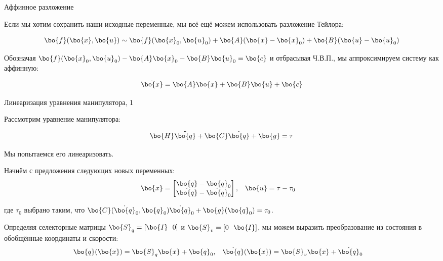 \documentclass{beamer}
\begin{document}
\begin{frame}{Аффинное разложение}
	\begin{flushleft}
		
		Если мы хотим сохранить наши исходные переменные, мы всё ещё можем использовать разложение Тейлора:
		
		\begin{equation}
			\bo{f}(\bo{x}, \bo{u}) 	\sim \bo{f}(\bo{x}_0, \bo{u}_0) +
			\bo{A} (\bo{x} - \bo{x}_0) + 
			\bo{B} (\bo{u} - \bo{u}_0)
		\end{equation}
		
		Обозначая $ \bo{f}(\bo{x}_0, \bo{u}_0) - \bo{A}\bo{x}_0 - \bo{B} \bo{u}_0 = \bo{c}$ и отбрасывая Ч.В.П., мы аппроксимируем систему как аффинную:
		
		\begin{equation}
			\dot{\bo{x}} = \bo{A} \bo{x} + 
			\bo{B} \bo{u} + \bo{c}
		\end{equation}
		
		
	\end{flushleft}
\end{frame}



\begin{frame}{Линеаризация уравнения манипулятора, 1}
	\begin{flushleft}
		
		Рассмотрим уравнение манипулятора:
		
		\begin{equation}
			\bo{H} \ddot{\bo{q}} + \bo{C} \dot{\bo{q}} + \bo{g} = \tau
		\end{equation}
		
		Мы попытаемся его линеаризовать.
		
		\bigskip
		
		Начнём с предложения следующих новых переменных:
		\begin{align}
			\bo{x} = 
			\begin{bmatrix}
				\bo{q} - \bo{q}_0 \\ 
				\dot{\bo{q}} - \dot{\bo{q}}_0
			\end{bmatrix},&  
			\ \ \
			\bo{u} = \tau - \tau_0
		\end{align}
		
		где $\tau_0$ выбрано таким, что $\bo{C}(\dot{\bo{q}}_0, \bo{q}_0) \dot{\bo{q}}_0 + \bo{g}(\bo{q}_0) = \tau_0$.
		
		\bigskip
		
		Определяя селекторные матрицы $\bo{S}_q = [ \bo{I} \ \ 0 ]$ и $\bo{S}_v = [ 0  \ \ \bo{I} ]$, мы можем выразить преобразование из состояния в обобщённые координаты и скорости:
		\begin{align}
			\bo{q}(\bo{x}) = \bo{S}_q \bo{x} + \bo{q}_0, &  
			\ \ \
			\dot{\bo{q}}(\bo{x}) = \bo{S}_v \bo{x} + \dot{\bo{q}}_0
		\end{align}
		
		
	\end{flushleft}
\end{frame}
\end{document}
